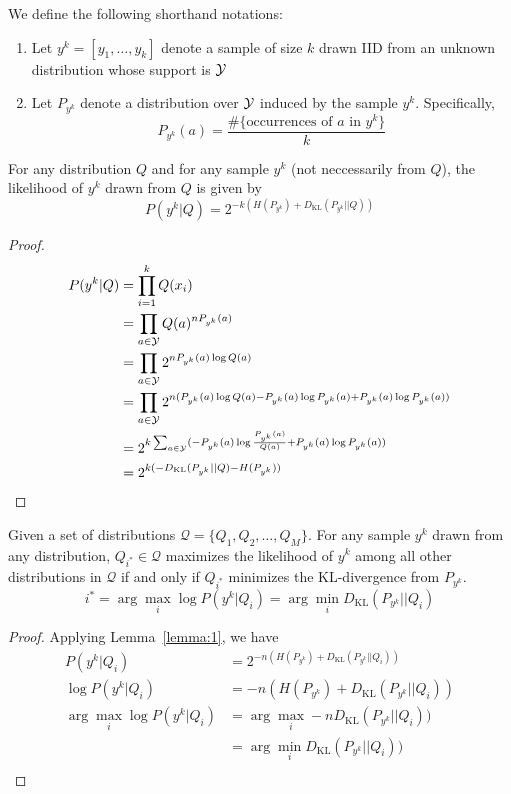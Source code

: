 \documentclass{article}
\begin{document}
\newcommand{\dkl}{D_{\mathrm{KL}}}

We define the following shorthand notations:
\begin{enumerate}
\item Let $y^k = [y_1, \ldots, y_k]$ denote a sample of size $k$ drawn
  IID from an unknown distribution whose support is $\mathcal{Y}$
\item Let $P_{y^k}$ denote a distribution over $\mathcal{Y}$ induced by the sample
  $y^k$. Specifically,
\[
P_{y^k}(a) = \frac{\#\{ \mbox{occurrences of } a \mbox{ in } y^k\}}{k}
\]
\end{enumerate} 

\begin{lemma}
\label{lemma:1}
For any distribution $Q$ and for any sample $y^k$ (not neccessarily
from $Q$), the likelihood of $y^k$ drawn from $Q$ is given by
\[
P(y^k|Q) = 2^{-k(H(P_{y^k}) + \dkl(P_{y^k} || Q))}
\]
\end{lemma}
\begin{proof}
  \begin{align*}
    P(y^k|Q) 
&= \prod_{i=1}^k Q(x_i)\\ 
&= \prod_{a \in \Y} Q(a)^{nP_{y^k}(a)}\\ 
&= \prod_{a \in \Y} 2^{nP_{y^k}(a) \log Q(a)}\\ 
&= \prod_{a \in \Y} 2^{n(P_{y^k}(a) \log Q(a) - P_{y^k}(a) \log P_{y^k}(a) + P_{y^k}(a) \log P_{y^k}(a))}\\ 
&= 2^{k \sum_{a \in \Y} (-P_{y^k}(a) \log \frac{P_{y^k}(a)}{Q(a)} + P_{y^k}(a) \log P_{y^k}(a) )}\\ 
&= 2^{k(-\dkl(P_{y^k}||Q) - H(P_{y^k}))}\\
  \end{align*}
\end{proof}


\begin{collorary}
\label{col:min_dkl}
Given a set of distributions $\mathcal{Q} = \{Q_1, Q_2, \ldots,
Q_{M}\}$. For any sample $y^k$ drawn from any distribution, $Q_{i^*}
\in \mathcal{Q}$ maximizes the likelihood of $y^k$ among all other
distributions in $\mathcal{Q}$ if and only if $Q_{i^*}$ minimizes the
KL-divergence from $P_{y^k}$.
\[
 i^* = \arg\max_i \log P(y^k|Q_i) = \arg\min_i \dkl(P_{y^k}||Q_i)
\]
\end{collorary}
\begin{proof}
  Applying Lemma~\ref{lemma:1}, we have
  \begin{align*}
    P(y^k|Q_i) &= 2^{-n(H(P_{y^k}) + \dkl(P_{y^k} || Q_i))}\\
    \log P(y^k|Q_i) &= -n(H(P_{y^k}) + \dkl(P_{y^k} || Q_i))\\
    \arg\max_i \log P(y^k|Q_i) &= \arg\max_i - n\dkl(P_{y^k} || Q_i))\\ 
    &= \arg\min_i \dkl(P_{y^k} || Q_i))\\
  \end{align*}
\end{proof}
\end{document}
